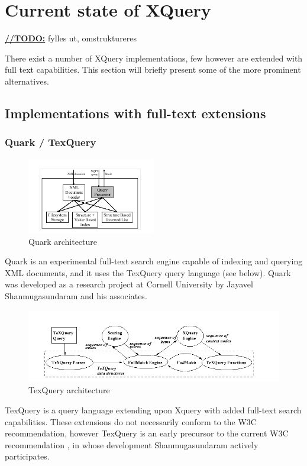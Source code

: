 \section{Current state of XQuery}
\underline{\textbf{\LARGE //TODO:}} fylles ut, omstruktureres

There exist a number of XQuery implementations, few however are extended with full text capabilities. This section will briefly present some of the more prominent alternatives.
\subsection{Implementations with full-text extensions}
\subsubsection{Quark / TexQuery}
\begin{figure}[!h]
  \centering
    \includegraphics[width=0.5\textwidth]{img/quark_architecture.png}
  \caption{Quark architecture}
\end{figure}
Quark is an experimental full-text search engine capable of indexing and querying XML documents, and it uses the TexQuery query language (see below). Quark was developed as a research project at Cornell University by Jayavel Shanmugasundaram and his associates.
\begin{figure}[!h]
  \centering
    \includegraphics[width=1\textwidth]{img/texquery_architecture.png}
  \caption{TexQuery architecture}
\end{figure}
TexQuery is a query language extending upon Xquery with added full-text search capabilities. These extensions do not necessarily conform to the W3C recommendation, however TexQuery is an early precursor to the current W3C recommendation \cite{TEXQ00}, in whose development Shanmugasundaram actively participates.

